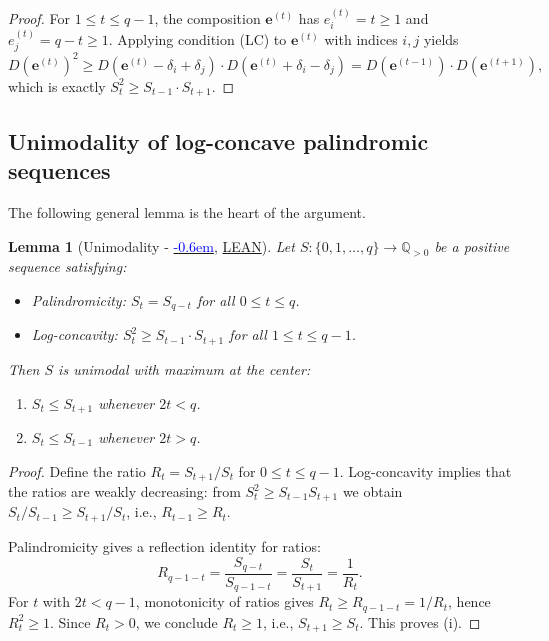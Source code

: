 \documentclass[12pt,reqno]{amsart}
\newtheorem{lemma}[theorem]{Lemma}
\theoremstyle{definition}
\newcommand\doublecheck{\textcolor{blue}{\checked\kern-0.6em\checked}}
\newcommand{\ee}{\mathbf{e}}
\newcommand{\QQ}{\mathbb{Q}}
\begin{document}
\begin{aiparagraph}
\begin{proof}
For $1 \leq t \leq q - 1$, the composition $\ee^{(t)}$ has $e^{(t)}_i = t \geq 1$ and $e^{(t)}_j = q - t \geq 1$. Applying condition \textup{(LC)} to $\ee^{(t)}$ with indices $i, j$ yields
\[
D(\ee^{(t)})^2 \geq D(\ee^{(t)} - \delta_i + \delta_j) \cdot D(\ee^{(t)} + \delta_i - \delta_j) = D(\ee^{(t-1)}) \cdot D(\ee^{(t+1)}),
\]
which is exactly $S_t^2 \geq S_{t-1} \cdot S_{t+1}$.
\end{proof}

\subsection{Unimodality of log-concave palindromic sequences}

The following general lemma is the heart of the argument.

\begin{lemma}[Unimodality - \href{https://schmittj.github.io/balanced-vectors-blueprint/sect0001.html\#lem:unimodal}{\doublecheck}, \href{https://schmittj.github.io/balanced-vectors-blueprint/docs/BalancedVectors.html\#unimodal_of_logconcave_palindromic}{LEAN}]\label{lem:unimodal_of_logconcave_palindromic}
Let $S : \{0, 1, \ldots, q\} \to \QQ_{>0}$ be a positive sequence satisfying:
\begin{itemize}
    \item Palindromicity: $S_t = S_{q-t}$ for all $0 \leq t \leq q$.
    \item Log-concavity: $S_t^2 \geq S_{t-1} \cdot S_{t+1}$ for all $1 \leq t \leq q - 1$.
\end{itemize}
Then $S$ is unimodal with maximum at the center:
\begin{enumerate}
    \item[\textup{(i)}] $S_t \leq S_{t+1}$ whenever $2t < q$.
    \item[\textup{(ii)}] $S_t \leq S_{t-1}$ whenever $2t > q$.
\end{enumerate}
\end{lemma}

\begin{proof}
Define the ratio $R_t = S_{t+1}/S_t$ for $0 \leq t \leq q - 1$. Log-concavity implies that the ratios are weakly decreasing: from $S_t^2 \geq S_{t-1} S_{t+1}$ we obtain $S_t/S_{t-1} \geq S_{t+1}/S_t$, i.e., $R_{t-1} \geq R_t$.

Palindromicity gives a reflection identity for ratios:
\[
R_{q-1-t} = \frac{S_{q-t}}{S_{q-1-t}} = \frac{S_t}{S_{t+1}} = \frac{1}{R_t}.
\]
For $t$ with $2t < q - 1$, monotonicity of ratios gives $R_t \geq R_{q-1-t} = 1/R_t$, hence $R_t^2 \geq 1$. Since $R_t > 0$, we conclude $R_t \geq 1$, i.e., $S_{t+1} \geq S_t$. This proves (i).


\end{proof}
\end{aiparagraph}
\end{document}
